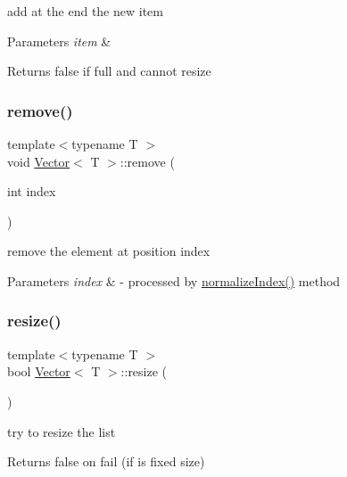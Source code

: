 add at the end the new item 
\begin{DoxyParams}{Parameters}
{\em item} & \\
\hline
\end{DoxyParams}
\begin{DoxyReturn}{Returns}
false if full and cannot resize 
\end{DoxyReturn}
\mbox{\label{classVector_abc1ce95078c61fd5826583b0de7279b4}} 
\subsubsection{\texorpdfstring{remove()}{remove()}}
{\footnotesize\ttfamily template$<$typename T $>$ \\
void \hyperlink{classVector}{Vector}$<$ T $>$\+::remove (\begin{DoxyParamCaption}\item[{int}]{index }\end{DoxyParamCaption})}

remove the element at position index 
\begin{DoxyParams}{Parameters}
{\em index} & -\/ processed by \hyperlink{classVector_a63f7ddd7328b13bc30b2243b50f70ec9}{normalize\+Index()} method \\
\hline
\end{DoxyParams}
\mbox{\label{classVector_a4f139733691594adab6343c9647ad318}} 
\subsubsection{\texorpdfstring{resize()}{resize()}}
{\footnotesize\ttfamily template$<$typename T $>$ \\
bool \hyperlink{classVector}{Vector}$<$ T $>$\+::resize (\begin{DoxyParamCaption}{ }\end{DoxyParamCaption})\hspace{0.3cm}{\ttfamily [private]}}

try to resize the list \begin{DoxyReturn}{Returns}
false on fail (if is fixed size) 
\end{DoxyReturn}
\mbox{\label{classVector_adb54584983bf6750f60d5ad375f6c603}} 
